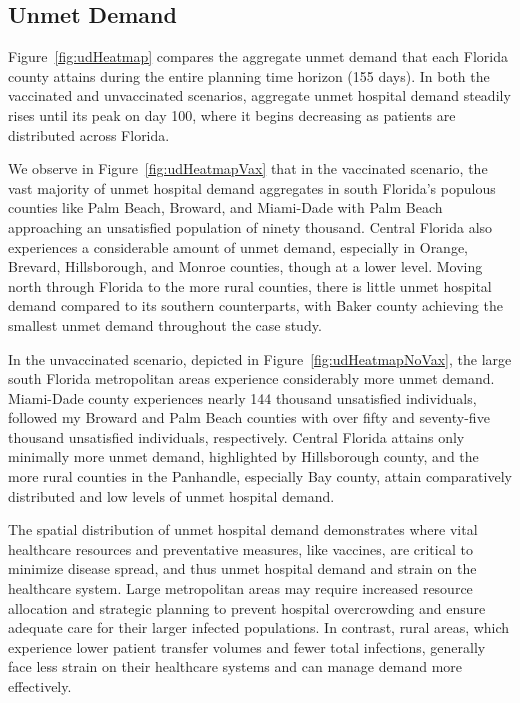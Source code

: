 \documentclass{article}
\begin{document}
\subsection{Unmet Demand}
{\color{blue} Figure~\ref{fig:udHeatmap} compares the aggregate unmet demand that each Florida county attains during the entire planning time horizon (155 days). In both the vaccinated and unvaccinated scenarios, aggregate unmet hospital demand steadily rises until its peak on day 100, where it begins decreasing as patients are distributed across Florida.}


We observe in Figure~\ref{fig:udHeatmapVax} that in the vaccinated scenario, the vast majority of unmet hospital demand aggregates in south Florida's populous counties like Palm Beach, Broward, and Miami-Dade with Palm Beach approaching an unsatisfied population of ninety thousand. Central Florida also experiences a considerable amount of unmet demand, especially in Orange, Brevard, Hillsborough, and Monroe counties, though at a lower level. Moving north through Florida to the more rural counties, there is little unmet hospital demand compared to its southern counterparts, with Baker county achieving the smallest unmet demand throughout the case study. 

In the unvaccinated scenario, depicted in Figure~\ref{fig:udHeatmapNoVax}, the large south Florida metropolitan areas experience considerably more unmet demand. Miami-Dade county experiences nearly 144 thousand unsatisfied individuals, followed my Broward and Palm Beach counties with over fifty and seventy-five thousand unsatisfied individuals, respectively. Central Florida attains only minimally more unmet demand, highlighted by Hillsborough county, and the more rural counties in the Panhandle, especially Bay county, attain comparatively distributed and low levels of unmet hospital demand. 

The spatial distribution of unmet hospital demand demonstrates where vital healthcare resources and preventative measures, like vaccines, are critical to minimize disease spread, and thus unmet hospital demand and strain on the healthcare system. Large metropolitan areas may require increased resource allocation and strategic planning to prevent hospital overcrowding and ensure adequate care for their larger infected populations. In contrast, rural areas, which experience lower patient transfer volumes and fewer total infections, generally face less strain on their healthcare systems and can manage demand more effectively.
\end{document}
